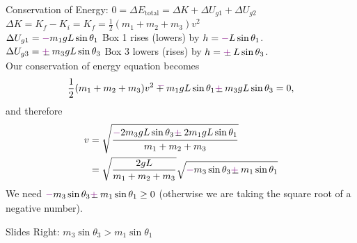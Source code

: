 \documentclass[]{article}
\begin{document}
\begin{TeacherMargin}
\noindent Conservation of Energy: $0 = \Delta E_{\text{total}} = \Delta K + \Delta U_{g1} + \Delta U_{g2}$ \\
$\Delta K = K_{f}-K_{i} = K_{f} = \frac{1}{2}(m_{1}+m_{2}+m_{3})v^{2}$ \\
$\Delta U_{g1} = {\color{violet}-}m_{1}gL\sin\theta_{1}$ \quad Box 1 rises {\color{violet}(lowers)} by $h={\color{violet}-}L\sin\theta_{1}$. \\
$\Delta U_{g3} = \Vpm m_{3}gL\sin\theta_{3}$ \quad Box 3 lowers {\color{violet}(rises)} by $h=\Vpm L\sin\theta_{3}$. \\
Our conservation of energy equation becomes
\[
\frac{1}{2}(m_{1}+m_{2}+m_{3})v^{2} \Vmp m_{1}gL\sin\theta_{1} \Vpm m_{3}gL\sin\theta_{3} = 0,
\]
and therefore
\begin{align*}
	v & = \sqrt{\frac{{\color{violet}-}2m_{3}gL\sin\theta_{3} \Vpm 2m_{1}gL\sin\theta_{1}}{m_{1}+m_{2}+m_{3}}} \\
	& =\sqrt{\frac{2gL}{m_{1}+m_{2}+m_{3}}}\sqrt{{\color{violet}-}m_{3}\sin\theta_{3}\Vpm m_{1}\sin\theta_{1}}
\end{align*}
We need ${\color{violet}-}m_{3}\sin\theta_{3}\Vpm m_{1}\sin\theta_{1}\geq0$ (otherwise we are taking the square root of a negative number).
\vspace{-10pt}
\begin{multicols}{2}
	\noindent Slides Right: $m_{3}\sin\theta_{3} > m_{1}\sin\theta_{1}$
	

\end{multicols}
\end{TeacherMargin}
\end{document}

